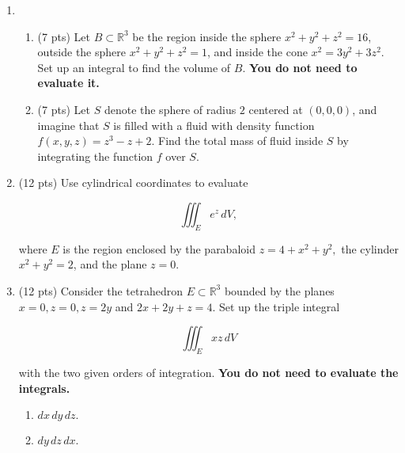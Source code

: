 \documentclass[12 pt]{report}
\begin{document}
\newpage
\begin{enumerate}

\item \begin{enumerate} 

\item (7 pts) Let $B \subset \mathbb{R}^3$ be the region inside the sphere $x^2 + y^2 + z^2 = 16$, outside the sphere $x^2 + y^2 + z^2 = 1$, and inside the cone $x^2 = 3y^2 + 3z^2$. Set up an integral to find the volume of $B$. \textbf{You do not need to evaluate it.}

\vfill

\item (7 pts) Let $S$ denote the sphere of radius $2$ centered at $(0,0,0)$, and imagine that $S$ is filled with a fluid with density function $f(x,y,z) = z^3 - z + 2$. Find the total mass of fluid inside $S$ by integrating the function $f$ over $S$. 

\vfill
\end{enumerate}


\newpage


\item (12 pts) Use cylindrical coordinates to evaluate 

\[
\iiint_E e^z \, dV,
\]

where $E$ is the region enclosed by the parabaloid $z = 4+x^2 + y^2,$ the cylinder $x^2+y^2 =2$, and the plane $z = 0$. 



\newpage


\item (12 pts) Consider the tetrahedron $E \subset \mathbb{R}^3$ bounded by the planes $x = 0, z = 0, z = 2y$ and $2x + 2y + z = 4$. Set up the triple integral 

\[
\iiint_E xz \, dV
\]

with the two given orders of integration. \textbf{You do not need to evaluate the integrals.}

\begin{enumerate} \item $dx \,dy \,dz.$
\vfill


\item $dy \, dz \, dx.$
\vfill
\end{enumerate}

%
%
%
%
%
%
%
%
%
%
%
%


\end{enumerate}
\end{document}

